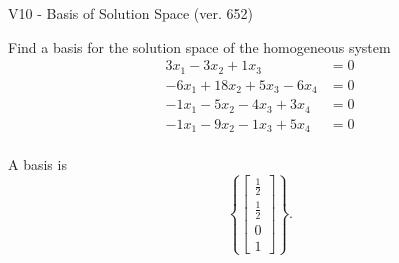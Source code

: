 \begin{exercise}
  \begin{exerciseTitle}V10 - Basis of Solution Space (ver. 652)\end{exerciseTitle}
  \begin{exerciseStatement}
    Find a basis for the solution space of the homogeneous system 
\begin{align*}
 3 x_ 1 -3 x_ 2 + 1 x_ 3 &= 0  \\ 
  -6 x_ 1 + 18 x_ 2 + 5 x_ 3 -6 x_ 4 &= 0  \\ 
  -1 x_ 1 -5 x_ 2 -4 x_ 3 + 3 x_ 4 &= 0  \\ 
  -1 x_ 1 -9 x_ 2 -1 x_ 3 + 5 x_ 4 &= 0  \\ 
 \end{align*}


 
  \end{exerciseStatement}

  \begin{exerciseAnswer}
   A basis is   
\[\left\{\left[\begin{array}{c}
\frac{1}{2} \\
\frac{1}{2} \\
0 \\
1
\end{array}\right]\right\}.\]

  


  \end{exerciseAnswer}
\end{exercise}